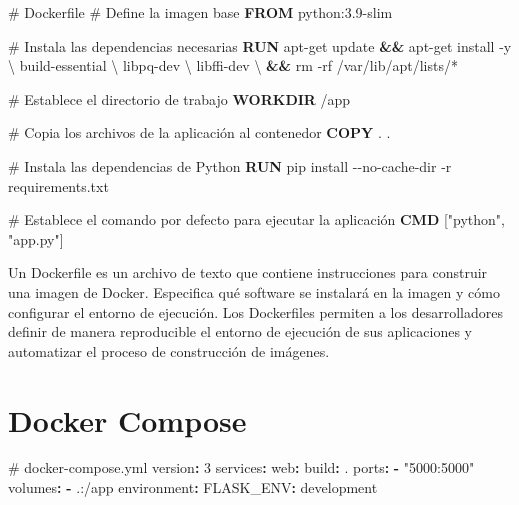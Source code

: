 \documentclass[
  a4paper,
  DIV=11,
  numbers=noendperiod,
  onepage,
  openany]{scrreprt}
\newenvironment{Shaded}{\begin{snugshade}}{\end{snugshade}}
\newcommand{\AttributeTok}[1]{\textcolor[rgb]{0.40,0.45,0.13}{#1}}
\newcommand{\CommentTok}[1]{\textcolor[rgb]{0.37,0.37,0.37}{#1}}
\newcommand{\DataTypeTok}[1]{\textcolor[rgb]{0.68,0.00,0.00}{#1}}
\newcommand{\ExtensionTok}[1]{\textcolor[rgb]{0.00,0.23,0.31}{#1}}
\newcommand{\FunctionTok}[1]{\textcolor[rgb]{0.28,0.35,0.67}{#1}}
\newcommand{\KeywordTok}[1]{\textcolor[rgb]{0.00,0.23,0.31}{\textbf{#1}}}
\newcommand{\NormalTok}[1]{\textcolor[rgb]{0.00,0.23,0.31}{#1}}
\newcommand{\PreprocessorTok}[1]{\textcolor[rgb]{0.68,0.00,0.00}{#1}}
\newcommand{\StringTok}[1]{\textcolor[rgb]{0.13,0.47,0.30}{#1}}
\begin{document}
\begin{Shaded}
\begin{Highlighting}[]
\CommentTok{\# Dockerfile}
\CommentTok{\# Define la imagen base}
\KeywordTok{FROM}\NormalTok{ python:3.9{-}slim}

\CommentTok{\# Instala las dependencias necesarias}
\KeywordTok{RUN} \ExtensionTok{apt{-}get}\NormalTok{ update }\KeywordTok{\&\&} \ExtensionTok{apt{-}get}\NormalTok{ install }\AttributeTok{{-}y} \DataTypeTok{\textbackslash{}}
\NormalTok{    build{-}essential }\DataTypeTok{\textbackslash{}}
\NormalTok{    libpq{-}dev }\DataTypeTok{\textbackslash{}}
\NormalTok{    libffi{-}dev }\DataTypeTok{\textbackslash{}}
    \KeywordTok{\&\&} \FunctionTok{rm} \AttributeTok{{-}rf}\NormalTok{ /var/lib/apt/lists/}\PreprocessorTok{*}

\CommentTok{\# Establece el directorio de trabajo}
\KeywordTok{WORKDIR}\NormalTok{ /app}

\CommentTok{\# Copia los archivos de la aplicación al contenedor}
\KeywordTok{COPY}\NormalTok{ . .}

\CommentTok{\# Instala las dependencias de Python}
\KeywordTok{RUN} \ExtensionTok{pip}\NormalTok{ install }\AttributeTok{{-}{-}no{-}cache{-}dir} \AttributeTok{{-}r}\NormalTok{ requirements.txt}

\CommentTok{\# Establece el comando por defecto para ejecutar la aplicación}
\KeywordTok{CMD}\NormalTok{ [}\StringTok{"python"}\NormalTok{, }\StringTok{"app.py"}\NormalTok{]}
\end{Highlighting}
\end{Shaded}

Un Dockerfile es un archivo de texto que contiene instrucciones para
construir una imagen de Docker. Especifica qué software se instalará en
la imagen y cómo configurar el entorno de ejecución. Los Dockerfiles
permiten a los desarrolladores definir de manera reproducible el entorno
de ejecución de sus aplicaciones y automatizar el proceso de
construcción de imágenes.

\section{Docker Compose 📙}\label{docker-compose}

\begin{Shaded}
\begin{Highlighting}[]
\CommentTok{\# docker{-}compose.yml}
\FunctionTok{version}\KeywordTok{:}\AttributeTok{ }\StringTok{\textquotesingle{}3\textquotesingle{}}
\FunctionTok{services}\KeywordTok{:}
\AttributeTok{  }\FunctionTok{web}\KeywordTok{:}
\AttributeTok{    }\FunctionTok{build}\KeywordTok{:}\AttributeTok{ .}
\AttributeTok{    }\FunctionTok{ports}\KeywordTok{:}
\AttributeTok{      }\KeywordTok{{-}}\AttributeTok{ }\StringTok{"5000:5000"}
\AttributeTok{    }\FunctionTok{volumes}\KeywordTok{:}
\AttributeTok{      }\KeywordTok{{-}}\AttributeTok{ .:/app}
\AttributeTok{    }\FunctionTok{environment}\KeywordTok{:}
\AttributeTok{      }\FunctionTok{FLASK\_ENV}\KeywordTok{:}\AttributeTok{ development}
\end{Highlighting}
\end{Shaded}
\end{document}
